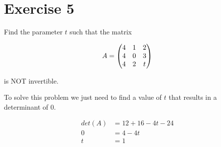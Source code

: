 \section*{Exercise 5}

Find the parameter $t$ such that the matrix 

\[A =  \begin{pmatrix} 4&1&2\\4&0&3\\4&2&t \end{pmatrix} \]

is NOT invertible.

To solve this problem we just need to find a value of $t$ that results in a determinant of 0.

\[
	\begin{aligned}
		det(A) &= 12 + 16 - 4t - 24 \\
		0 &= 4 - 4t \\
		t &= 1
	\end{aligned}
\]
